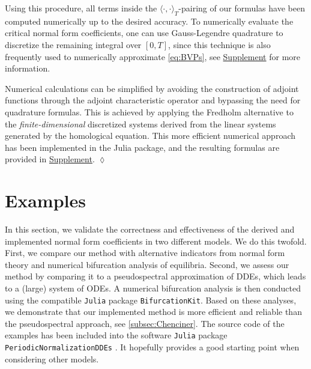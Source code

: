 \documentclass[english]{myarticle}
\begin{document}
\begin{sloppypar}
Using this procedure, all terms inside the $\langle \cdot, \cdot \rangle_T$-pairing of our formulas have been computed numerically up to the desired accuracy. To numerically evaluate the critical normal form coefficients, one can use Gauss-Legendre quadrature to discretize the remaining integral over $[0,T]$, since this technique is also frequently used to numerically approximate \eqref{eq:BVPs}, see \hyperlink{mysupplement}{Supplement} for more information.

\begin{remark} \label{remark:efficient}
Numerical calculations can be simplified by avoiding the construction of adjoint functions through the adjoint characteristic operator and bypassing the need for quadrature formulas. This is achieved by applying the Fredholm alternative to the \emph{finite-dimensional} discretized systems derived from the linear systems generated by the homological equation. This more efficient numerical approach has been implemented in the Julia package, and the resulting formulas are provided in \hyperlink{mysupplement}{Supplement}. \hfill $\lozenge$
\end{remark}

\section{Examples} \label{sec:examples}
In this section, we validate the correctness and effectiveness of the derived and implemented normal form coefficients in two different models. We do this twofold. First, we compare our method with alternative indicators from normal form theory and numerical bifurcation analysis of equilibria. Second, we assess our method by comparing it to a pseudospectral approximation of DDEs, which leads to a (large) system of ODEs. A numerical bifurcation analysis is then conducted using the compatible \verb|Julia| package \verb|BifurcationKit|. Based on these analyses, we demonstrate that our implemented method is more efficient and reliable than the pseudospectral approach, see \cref{subsec:Chenciner}. The source code of the examples has been included into the software \verb|Julia| package \verb|PeriodicNormalizationDDEs| \cite{Bosschaert2024c}. It hopefully provides a good starting point when considering other models.


\end{sloppypar}
\end{document}
